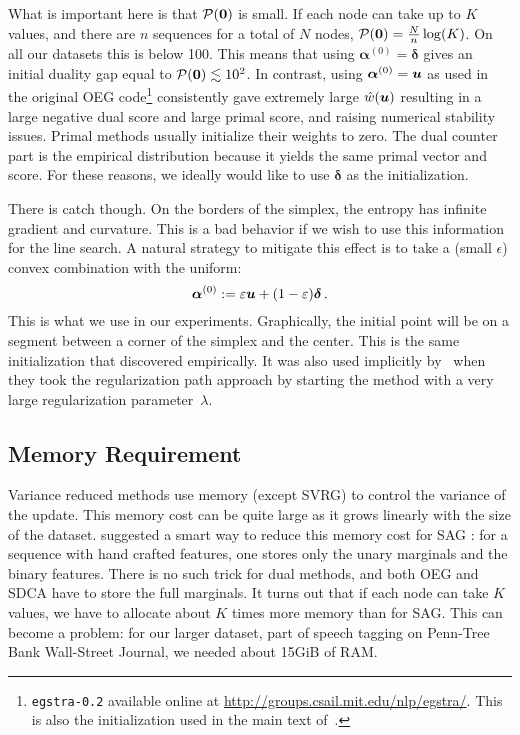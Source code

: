 \begin{subappendices}
	What is important here is that ${\mathcal P}(\bm{0})$ is small.
	If each node can take up to $K$ values, and there are $n$ sequences for a total of $N$ nodes, ${\mathcal P}(\bm{0}) = \frac{N}{n}\log(K)$.
	On all our datasets this is below 100.
	This means that using $\bm{\alpha}^{(0)}=\bm\delta$ gives an initial duality gap equal to ${\mathcal P}(\bm{0})\lesssim10^2$.
	In contrast, using $\bm{\alpha}^{(0)} = \bm u$ as used in the original OEG code\footnote{\texttt{egstra-0.2} available online at \url{http://groups.csail.mit.edu/nlp/egstra/}. This is also the initialization used in the main text of~\citet{schmidt2015non}.} consistently gave extremely large $\hat w(\bm u)$ resulting in a large negative dual score and large primal score, and raising numerical stability issues.
	Primal methods usually initialize their weights to zero.
	The dual counter part is the empirical distribution because it yields the same primal vector and score.
	For these reasons, we ideally would like to use $\bm\delta$ as the initialization.

	There is catch though. On the borders of the simplex, the entropy has infinite gradient and curvature.
	This is a bad behavior if we wish to use this information for the line search.
	A natural strategy to mitigate this effect is to take a (small $\epsilon$) convex combination with the uniform:
	\begin{equation} \label{eq:initialization:app}
		\boldsymbol{\alpha}^{(0)} := \varepsilon \bm u + (1-\varepsilon) \bm\delta \, .
	\end{equation}
	This is what we use in our experiments.
	Graphically, the initial point will be on a segment between a corner of the simplex and the center.
	This is the same initialization that \citet[App.~D of the Sup.~Mat.]{schmidt2015non} discovered empirically. It was also used implicitly by~\citet{collins2008exponentiated} when they took the regularization path approach by starting the method with a very large regularization parameter~$\lambda$.

	\subsection{Memory Requirement}

	Variance reduced methods use memory (except SVRG) to control the variance of the update.
	This memory cost can be quite large as it grows linearly with the size of the dataset.
	\citet{schmidt2015non} suggested a smart way to reduce this memory cost for  SAG : for a sequence with hand crafted features, one stores only the unary marginals and the binary features.
	There is no such trick for dual methods, and both OEG and SDCA have to store the full marginals.
	It turns out that if each node can take $K$ values, we have to allocate about $K$ times more memory than for SAG.
	This can become a problem: for our larger dataset, part of speech tagging on Penn-Tree Bank Wall-Street Journal, we needed about 15GiB of RAM.


\end{subappendices}
